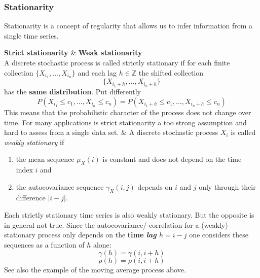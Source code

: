 \subsubsection{Stationarity}
{
Stationarity is a concept of regularity that allows us to infer information from a single time series.

\begin{twoColTable}
	\hline
{}\textbf{Strict stationarity}
& \textbf{Weak stationarity}\\
\hline
	A discrete stochastic process is called strictly stationary if for each finite collection $\{X_{i_1}, . . . , X_{i_n}\}$ and each lag $h \in \mathbb{Z}$ the shifted collection
$$ \{X_{{i_1}+h}, . . . , X_{{i_n}+h}\} $$
has the \textbf{same distribution}. Put differently
$$ P(X_{i_1} \leq c_1,...,X_{i_n} \leq c_n)=P(X_{{i_1}+h} \leq c_1,...,X_{{i_n}+h} \leq c_n)$$
This means that the probabilistic character of the process does not change over time. For many applications is strict stationarity a too strong assumption and hard to assess from a single data set.
&
A discrete stochastic process $X_i$ is called \textit{weakly stationary} if
\begin{enumerate}
	\item the mean sequence $\mu_X(i)$ is constant and does not depend on the time index $i$ and
	\item the autocovariance sequence $\gamma_X(i,j)$ depends on $i$ and $j$ only through their difference $|i-j|$.
\end{enumerate}
Each strictly stationary time series is also weakly stationary. But the opposite is in general not true.
\vfill
\hfill
\break
Since the autocovariance/-correlation for a (weakly) stationary process only depends on the {\textbf{time \textit{lag} $h=i-j$}} one considers these sequences as a function of $h$ alone:
$$ 
\gamma(h)=\gamma(i,i+h)
$$
$$
\rho(h)=\rho(i,i+h)
$$
See also the example of the moving average process above.
\\
\hline
\end{twoColTable}
}
